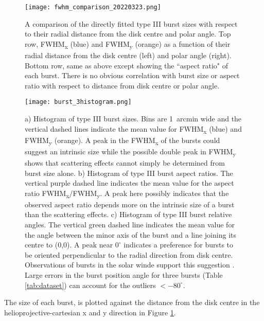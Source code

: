\begin{figure}
\centering
\texttt{[image: fwhm\_comparison\_20220323.png]}
\caption[Directly fitted type III burst sizes as a function of position relative to disk centre.]{A comparison of the directly fitted type III burst sizes with respect to their radial distance from the disk centre and polar angle. Top row, FWHM\textsubscript{x} (blue) and FWHM\textsubscript{y} (orange) as a function of their radial distance from the disk centre (left) and polar angle (right). Bottom row, same as above except showing the ``aspect ratio" of each burst. There is no obvious correlation with burst size or aspect ratio with respect to distance from disk centre or polar angle.}
\label{fig:fwhm_comp}
\end{figure}

\begin{figure}
\centering
\texttt{[image: burst\_3histogram.png]}
\caption[Histograms of type III burst sizes, aspect ratios and relative angles.]{a) Histogram of type III burst sizes. Bins are 1~arcmin wide and the vertical dashed lines indicate the mean value for FWHM\textsubscript{x} (blue) and FWHM\textsubscript{y} (orange). A peak in the FWHM\textsubscript{x} of the bursts could suggest an intrinsic size while the possible double peak in FWHM\textsubscript{y} shows that scattering effects cannot simply be determined from burst size alone. b) Histogram of type III burst aspect ratios. The vertical purple dashed line indicates the mean value for the aspect ratio FWHM\textsubscript{x}/FWHM\textsubscript{y}. A peak here possibly indicates that the observed aspect ratio depends more on the intrinsic size of a burst than the scattering effects. c) Histogram of type III burst relative angles. The vertical green dashed line indicates the mean value for the angle between the minor axis of the burst and a line joining its centre to (0,0). A peak near $0^\circ$ indicates a preference for bursts to be oriented perpendicular to the radial direction from disk centre. Observations of bursts in the solar winde support this suggestion \citep{Anantharamaiah1994,SasikumarRaja2016}. Large errors in the burst position angle for three bursts (Table \ref{tab:dataset}) can account for the outliers $< -80^\circ$.}
\label{fig:burst_hist}
\end{figure}
The size of each burst, is plotted against the distance from the disk centre in the helioprojective-cartesian x and y direction in Figure \ref{fig:fwhm_comp}. 
